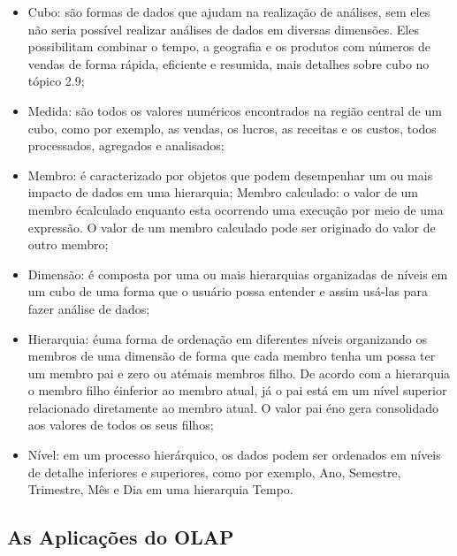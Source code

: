 \begin{itemize}

    \item Cubo: são formas de dados que ajudam na realização de análises, sem eles não seria possível realizar análises de dados em diversas dimensões. Eles possibilitam combinar o tempo, a geografia e os produtos com números de vendas de forma r\'{a}pida, eficiente e resumida, mais detalhes sobre cubo no tópico 2.9;
    
    \item Medida: são todos os valores numéricos encontrados na região central de um cubo, como por exemplo, as vendas, os lucros, as receitas e os custos, todos processados, agregados e analisados;
    
    \item Membro: \'{e} caracterizado por objetos que podem desempenhar um ou mais impacto de dados em uma hierarquia;
    Membro calculado: o valor de um membro \'{e}calculado enquanto esta ocorrendo uma execução por meio de uma expressão. O valor de um membro calculado pode ser originado do valor de outro membro;
    
    \item Dimensão: \'{e} composta por uma ou mais hierarquias organizadas de níveis em um cubo de uma forma que o usuário possa entender e assim usá-las para fazer análise de dados;
    
    \item Hierarquia: \'{e}uma forma de ordenação em diferentes níveis organizando os membros de uma dimensão de forma que cada membro tenha um possa ter um membro pai e zero ou at\'{e}mais membros filho. De acordo com a hierarquia o membro filho \'{e}inferior ao membro atual, já o pai está em um nível superior relacionado diretamente ao membro atual. O valor pai \'{e}no gera consolidado aos valores de todos os seus filhos;
    
    \item Nível: em um processo hierárquico, os dados podem ser ordenados em níveis de detalhe inferiores e superiores, como por exemplo, Ano, Semestre, Trimestre, Mês e Dia em uma hierarquia Tempo.

\end{itemize}

\subsection{As Aplica\c{c}ões do OLAP}

